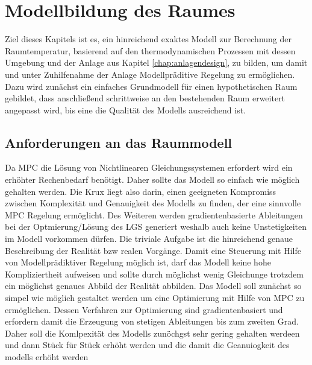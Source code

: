 %
%

\renewcommand{\chapterheadstartvskip}{\vspace*{2cm}}

\chapter{Modellbildung des Raumes}
\label{chap:modellbildung}



Ziel dieses Kapitels ist es, ein hinreichend exaktes Modell zur Berechnung der Raumtemperatur, basierend auf den thermodynamischen Prozessen mit dessen Umgebung und der Anlage aus Kapitel \ref{chap:anlagendesign}, zu bilden, um damit und unter Zuhilfenahme der Anlage Modellpräditive Regelung zu ermöglichen.
Dazu wird zunächst ein einfaches Grundmodell für einen hypothetischen Raum gebildet, dass anschließend schrittweise an den bestehenden Raum erweitert angepasst wird, bis eine die Qualität des Modells ausreichend ist.

\section{Anforderungen an das Raummodell}
Da MPC die Lösung von Nichtlinearen Gleichungssystemen erfordert wird ein erhöhter Rechenbedarf benötigt. Daher sollte das Modell so einfach wie möglich gehalten werden. Die Krux liegt also darin, einen geeigneten Kompromiss zwischen Komplexität und Genauigkeit des Modells zu finden, der eine sinnvolle MPC Regelung ermöglicht.
Des Weiteren werden gradientenbasierte Ableitungen bei der Optmierung/Lösung des LGS generiert weshalb auch keine Unstetigkeiten im Modell vorkommen dürfen.
Die triviale Aufgabe ist die hinreichend genaue Beschreibung der Realität bzw realen Vorgänge.
Damit eine Steuerung mit Hilfe von Modellprädiktiver Regelung möglich ist, darf das Modell keine hohe Kompliziertheit aufweisen und sollte durch möglichst wenig Gleichunge trotzdem ein möglichst genaues Abbild der Realität abbilden.
Das Modell soll zunächst so simpel wie möglich gestaltet werden um eine Optimierung mit Hilfe von MPC zu ermöglichen. Dessen Verfahren zur Optimierung sind gradientenbasiert und erfordern damit die Erzeugung von stetigen Ableitungen bis zum zweiten Grad. Daher soll die Komlpexität des Modells zunöchgst sehr gering gehalten werdeen und dann Stück für Stück erhöht werden und die damit die Geanuiogkeit des modells erhöht werden

